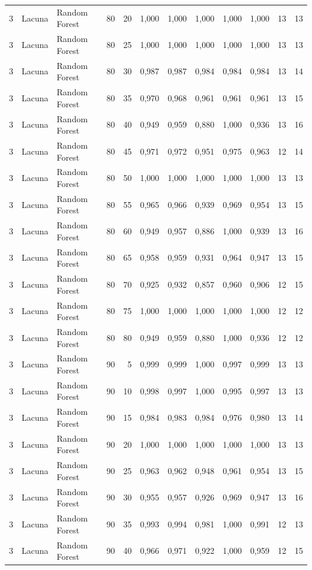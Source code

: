 \begin{longtable}{@{}rllrrrrrrrrr@{}}
3 & Lacuna & Random Forest & 80 & 20 & 1,000 & 1,000 & 1,000 & 1,000 & 1,000 & 13 & 13 \\
3 & Lacuna & Random Forest & 80 & 25 & 1,000 & 1,000 & 1,000 & 1,000 & 1,000 & 13 & 13 \\
3 & Lacuna & Random Forest & 80 & 30 & 0,987 & 0,987 & 0,984 & 0,984 & 0,984 & 13 & 14 \\
3 & Lacuna & Random Forest & 80 & 35 & 0,970 & 0,968 & 0,961 & 0,961 & 0,961 & 13 & 15 \\
3 & Lacuna & Random Forest & 80 & 40 & 0,949 & 0,959 & 0,880 & 1,000 & 0,936 & 13 & 16 \\
3 & Lacuna & Random Forest & 80 & 45 & 0,971 & 0,972 & 0,951 & 0,975 & 0,963 & 12 & 14 \\
3 & Lacuna & Random Forest & 80 & 50 & 1,000 & 1,000 & 1,000 & 1,000 & 1,000 & 13 & 13 \\
3 & Lacuna & Random Forest & 80 & 55 & 0,965 & 0,966 & 0,939 & 0,969 & 0,954 & 13 & 15 \\
3 & Lacuna & Random Forest & 80 & 60 & 0,949 & 0,957 & 0,886 & 1,000 & 0,939 & 13 & 16 \\
3 & Lacuna & Random Forest & 80 & 65 & 0,958 & 0,959 & 0,931 & 0,964 & 0,947 & 13 & 15 \\
3 & Lacuna & Random Forest & 80 & 70 & 0,925 & 0,932 & 0,857 & 0,960 & 0,906 & 12 & 15 \\
3 & Lacuna & Random Forest & 80 & 75 & 1,000 & 1,000 & 1,000 & 1,000 & 1,000 & 12 & 12 \\
3 & Lacuna & Random Forest & 80 & 80 & 0,949 & 0,959 & 0,880 & 1,000 & 0,936 & 12 & 12 \\
3 & Lacuna & Random Forest & 90 & 5 & 0,999 & 0,999 & 1,000 & 0,997 & 0,999 & 13 & 13 \\
3 & Lacuna & Random Forest & 90 & 10 & 0,998 & 0,997 & 1,000 & 0,995 & 0,997 & 13 & 13 \\
3 & Lacuna & Random Forest & 90 & 15 & 0,984 & 0,983 & 0,984 & 0,976 & 0,980 & 13 & 14 \\
3 & Lacuna & Random Forest & 90 & 20 & 1,000 & 1,000 & 1,000 & 1,000 & 1,000 & 13 & 13 \\
3 & Lacuna & Random Forest & 90 & 25 & 0,963 & 0,962 & 0,948 & 0,961 & 0,954 & 13 & 15 \\
3 & Lacuna & Random Forest & 90 & 30 & 0,955 & 0,957 & 0,926 & 0,969 & 0,947 & 13 & 16 \\
3 & Lacuna & Random Forest & 90 & 35 & 0,993 & 0,994 & 0,981 & 1,000 & 0,991 & 12 & 13 \\
3 & Lacuna & Random Forest & 90 & 40 & 0,966 & 0,971 & 0,922 & 1,000 & 0,959 & 12 & 15 \\

\end{longtable}

